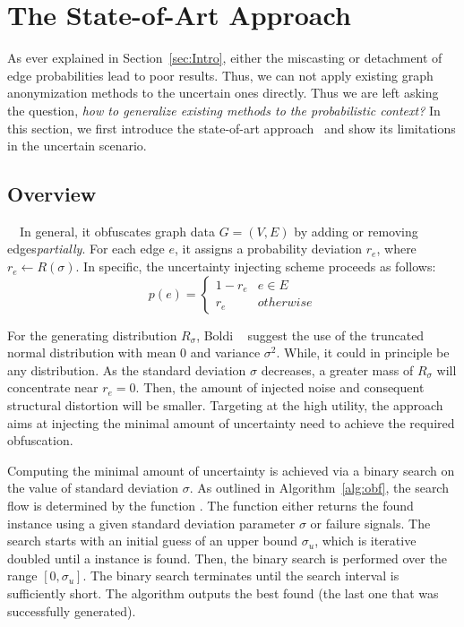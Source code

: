 \section{The State-of-Art Approach}
As ever explained in Section~\ref{sec:Intro}, either the miscasting or detachment of edge probabilities lead to poor results. Thus, we can not apply existing graph anonymization methods to the uncertain ones directly. 
Thus we are left asking the question, \emph{how to generalize existing methods to the probabilistic context?}
In this section, we first introduce the state-of-art approach~\cite{Boldi_Injecting_2012} and show its limitations in the uncertain scenario.  

\subsection{Overview}~~In general, it obfuscates graph data $G=(V,E)$ by adding or removing edges\emph{partially}. For each edge $e$, it assigns a probability deviation $r_{e}$, where $r_{e} \leftarrow R(\sigma)$. In specific, the uncertainty injecting scheme proceeds as follows:
\begin{equation}
	p(e) =
	\begin{cases}
		 1-r_{e}  & e \in E \\
		 r_{e}    & otherwise 
	\end{cases}
	\label{eq:inject}
\end{equation}

For the generating distribution $R_{\sigma}$, Boldi {\etal}~\cite{Boldi_Injecting_2012} suggest the use of the truncated normal distribution with mean 0 and variance $\sigma^2$. While, it could in principle be any distribution. As the standard deviation $\sigma$ decreases, a greater mass of $R_{\sigma}$ will concentrate near $r_{e}=0$.  Then, the amount of injected noise and consequent structural distortion  will be smaller. Targeting at the high utility, the approach aims at injecting the minimal amount of uncertainty need to achieve the required obfuscation. 



Computing the minimal amount of uncertainty is achieved via a binary search on the value of standard deviation $\sigma$. As outlined in Algorithm~\ref{alg:obf}, the search flow is determined by the function {\genobf}. The function {\genobf} either returns the found {\keobf} instance using a given standard deviation parameter $\sigma$ or failure signals. The search starts with an initial guess of an upper bound $\sigma_{u}$, which is iterative doubled until a {\keobf} instance is found. Then, the binary search is performed over the range $[0,\sigma_{u}]$. The binary search terminates until the search interval is sufficiently short. The algorithm outputs the best {\keobf} found (the last one that was successfully generated).

